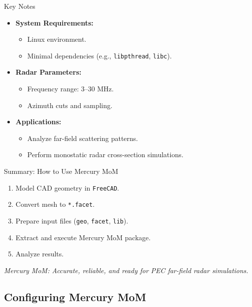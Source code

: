 \begin{frame}{Key Notes}
    \begin{itemize}
        \item \textbf{System Requirements:}
            \begin{itemize}
                \item Linux environment.
                \item Minimal dependencies (e.g., \texttt{libpthread}, \texttt{libc}).
            \end{itemize}
        \item \textbf{Radar Parameters:}
            \begin{itemize}
                \item Frequency range: 3–30 MHz.
                \item Azimuth cuts and sampling.
            \end{itemize}
        \item \textbf{Applications:}
            \begin{itemize}
                \item Analyze far-field scattering patterns.
                \item Perform monostatic radar cross-section simulations.
            \end{itemize}
    \end{itemize}
\end{frame}

\begin{frame}{Summary: How to Use Mercury MoM}
    \begin{enumerate}
        \item Model CAD geometry in \texttt{FreeCAD}.
        \item Convert mesh to \texttt{*.facet}.
        \item Prepare input files (\texttt{geo}, \texttt{facet}, \texttt{lib}).
        \item Extract and execute Mercury MoM package.
        \item Analyze results.
    \end{enumerate}
    \vspace{1em}
    \centering
    \textit{Mercury MoM: Accurate, reliable, and ready for PEC far-field radar simulations.}
\end{frame}
	
\subsection{Configuring Mercury MoM}

